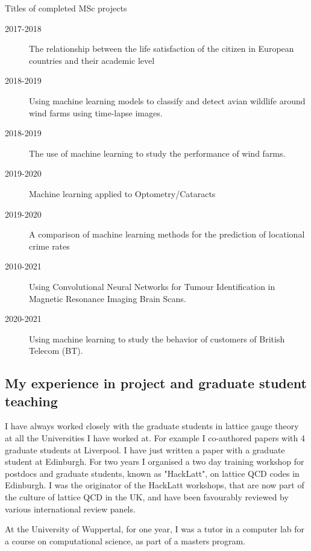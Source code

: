 \documentclass[12pt]{article}
\begin{document}
Titles of completed MSc projects
\begin{description}

\item[2017-2018] The relationship between the life satisfaction of the
citizen in European countries and their academic level

\item[2018-2019] Using machine learning models to classify and detect
  avian wildlife around wind farms using time-lapse images.

\item[2018-2019] The use of machine learning to study the performance
  of wind farms.

\item[2019-2020] Machine learning applied to Optometry/Cataracts

\item[2019-2020] A comparison of machine learning methods for the
  prediction of locational crime rates

\item[2010-2021] Using Convolutional Neural Networks
for Tumour Identification in
Magnetic Resonance Imaging
Brain Scans.

\item[2020-2021] Using machine learning to study the behavior of
  customers of British Telecom (BT). 

\end{description}

\subsection{My experience in project and graduate student teaching}


I have always worked closely with the graduate students in
lattice gauge theory at all the Universities I have worked at. 
For example I co-authored papers with 4 graduate students
at Liverpool. I have just written a paper with a graduate student
at Edinburgh.
For two years I organised a two
day training workshop for postdocs and graduate students, 
known as "HackLatt", on lattice QCD codes in
Edinburgh. I was the originator of the HackLatt workshops, that are
now part of the culture of lattice QCD in the UK, and have been favourably
reviewed by various international review panels.  


At the University of Wuppertal, for one year, I was a tutor in
a computer lab for a course on computational 
science, as part of a masters program.
\end{document}
